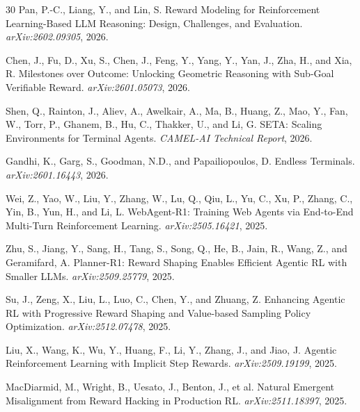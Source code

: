 \documentclass[11pt]{article}
\begin{document}
\begin{thebibliography}{30}
Pan, P.-C., Liang, Y., and Lin, S.
\newblock Reward Modeling for Reinforcement Learning-Based LLM Reasoning: Design, Challenges, and Evaluation.
\newblock \emph{arXiv:2602.09305}, 2026.

Chen, J., Fu, D., Xu, S., Chen, J., Feng, Y., Yang, Y., Yan, J., Zha, H., and Xia, R.
\newblock Milestones over Outcome: Unlocking Geometric Reasoning with Sub-Goal Verifiable Reward.
\newblock \emph{arXiv:2601.05073}, 2026.

Shen, Q., Rainton, J., Aliev, A., Awelkair, A., Ma, B., Huang, Z., Mao, Y., Fan, W., Torr, P., Ghanem, B., Hu, C., Thakker, U., and Li, G.
\newblock SETA: Scaling Environments for Terminal Agents.
\newblock \emph{CAMEL-AI Technical Report}, 2026.

Gandhi, K., Garg, S., Goodman, N.D., and Papailiopoulos, D.
\newblock Endless Terminals.
\newblock \emph{arXiv:2601.16443}, 2026.

Wei, Z., Yao, W., Liu, Y., Zhang, W., Lu, Q., Qiu, L., Yu, C., Xu, P., Zhang, C., Yin, B., Yun, H., and Li, L.
\newblock WebAgent-R1: Training Web Agents via End-to-End Multi-Turn Reinforcement Learning.
\newblock \emph{arXiv:2505.16421}, 2025.

Zhu, S., Jiang, Y., Sang, H., Tang, S., Song, Q., He, B., Jain, R., Wang, Z., and Geramifard, A.
\newblock Planner-R1: Reward Shaping Enables Efficient Agentic RL with Smaller LLMs.
\newblock \emph{arXiv:2509.25779}, 2025.

Su, J., Zeng, X., Liu, L., Luo, C., Chen, Y., and Zhuang, Z.
\newblock Enhancing Agentic RL with Progressive Reward Shaping and Value-based Sampling Policy Optimization.
\newblock \emph{arXiv:2512.07478}, 2025.

Liu, X., Wang, K., Wu, Y., Huang, F., Li, Y., Zhang, J., and Jiao, J.
\newblock Agentic Reinforcement Learning with Implicit Step Rewards.
\newblock \emph{arXiv:2509.19199}, 2025.

MacDiarmid, M., Wright, B., Uesato, J., Benton, J., et al.
\newblock Natural Emergent Misalignment from Reward Hacking in Production RL.
\newblock \emph{arXiv:2511.18397}, 2025.


\end{thebibliography}
\end{document}
